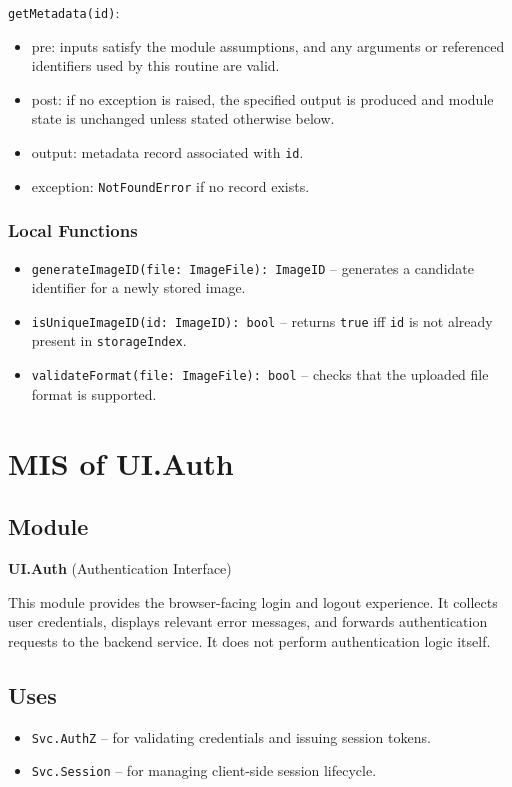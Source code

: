 \documentclass[12pt, titlepage]{article}
\begin{document}
\noindent \texttt{getMetadata(id)}:
\begin{itemize}
    \item pre: inputs satisfy the module assumptions, and any arguments or referenced identifiers used by this routine are valid.
    \item post: if no exception is raised, the specified output is produced and module state is unchanged unless stated otherwise below.
    \item output: metadata record associated with \texttt{id}.
    \item exception: \texttt{NotFoundError} if no record exists.
\end{itemize}

\subsubsection{Local Functions}
\begin{itemize}
    \item \texttt{generateImageID(file: ImageFile): ImageID} – generates a candidate identifier for a newly stored image.
    \item \texttt{isUniqueImageID(id: ImageID): bool} – returns \texttt{true} iff \texttt{id} is not already present in \texttt{storageIndex}.
    \item \texttt{validateFormat(file: ImageFile): bool} – checks that the uploaded file format is supported.
\end{itemize}



\section{MIS of UI.Auth} \label{UI.Auth}

\subsection{Module}
\textbf{UI.Auth} \; (Authentication Interface)

This module provides the browser-facing login and logout experience. It collects user credentials, displays relevant error messages, and forwards authentication requests to the backend service. It does not perform authentication logic itself.

\subsection{Uses}
\begin{itemize}
    \item \texttt{Svc.AuthZ} – for validating credentials and issuing session tokens.
    \item \texttt{Svc.Session} – for managing client-side session lifecycle.
\end{itemize}
\end{document}
